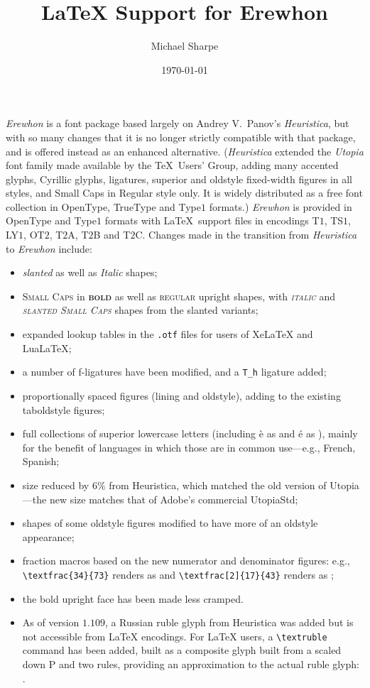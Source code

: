 \documentclass[11pt]{amsart}
\title{LaTeX Support for Erewhon}
\author{Michael Sharpe}
\date{\today}  %
\begin{document}
\maketitle

\emph{Erewhon} is a font package based largely on Andrey V.\ Panov's \emph{Heuristica}, but with so many changes that it is no longer strictly compatible with that package, and is offered instead as an enhanced alternative. (\emph{Heuristica}  extended the \emph{Utopia} font family made available by the \TeX\ Users' Group, adding many accented glyphs, Cyrillic glyphs, ligatures, superior and oldstyle fixed-width figures in all styles, and Small Caps in Regular style only. It is widely distributed as a free font collection in OpenType, TrueType and Type$1$ formats.) \emph{Erewhon} is provided in OpenType and Type$1$ formats with \LaTeX\ support files in encodings T$1$, TS$1$, LY$1$, OT$2$, T$2$A, T$2$B and T$2$C.  Changes made in the transition from \emph{Heuristica} to \emph{Erewhon} include:
\begin{itemize}
\item
\textsl{slanted} as well as \textit{Italic} shapes;
\item
\textsc{Small Caps} in \textsc{\textbf{bold}} as well as \textsc{regular} upright shapes, with \textsc{\textit{italic}} and \textsc{\textsl{slanted  Small Caps}} shapes from the slanted variants;
\item expanded lookup tables in the {\tt.otf} files for users of XeLaTeX and LuaLaTeX;
\item a number of f-ligatures have been modified, and a \verb|T_h| ligature added;
\item proportionally spaced figures (lining and oldstyle), adding to the existing taboldstyle figures;
\item full collections of superior lowercase letters (including \`e as  and \'e as ), mainly for the benefit of languages in which those are in common use---e.g., French, Spanish;
\item size reduced by 6\% from Heuristica, which matched the old version of Utopia---the new size matches that of Adobe's commercial UtopiaStd;
\item shapes of some oldstyle figures modified to have more of an oldstyle appearance;
\item fraction macros based on the new numerator and denominator figures: e.g., \verb|\textfrac{34}{73}| renders as  and \verb|\textfrac[2]{17}{43}| renders as ;
\item the bold upright face has been made less cramped.
\item As of version $1.109$, a Russian ruble glyph from Heuristica was added but is not accessible from LaTeX encodings. For LaTeX users, a \verb|\textruble| command has been added, built as a composite glyph built from a scaled down P and two rules, providing an approximation to the actual ruble glyph: \textruble.
\end{itemize}
\end{document}
